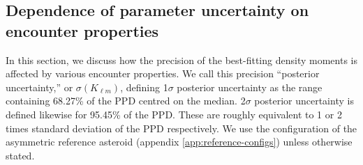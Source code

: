 \documentclass[fleqn,usenatbib]{mnras}
\begin{document}








\subsection{Dependence of parameter uncertainty on encounter properties}
\label{sec:fit-uncertainty}

In this section, we discuss how the precision of the best-fitting density moments is affected by various encounter properties. We call this precision ``posterior uncertainty,'' or $\sigma(K_{\ell m})$, defining 1$\sigma$  posterior uncertainty as the range containing 68.27\% of the PPD centred on the median. 2$\sigma$ posterior uncertainty is defined likewise for 95.45\% of the PPD. These are roughly equivalent to 1 or 2 times standard deviation of the PPD respectively. We use the configuration of the asymmetric reference asteroid (appendix \ref{app:reference-configs}) unless otherwise stated.
\end{document}

